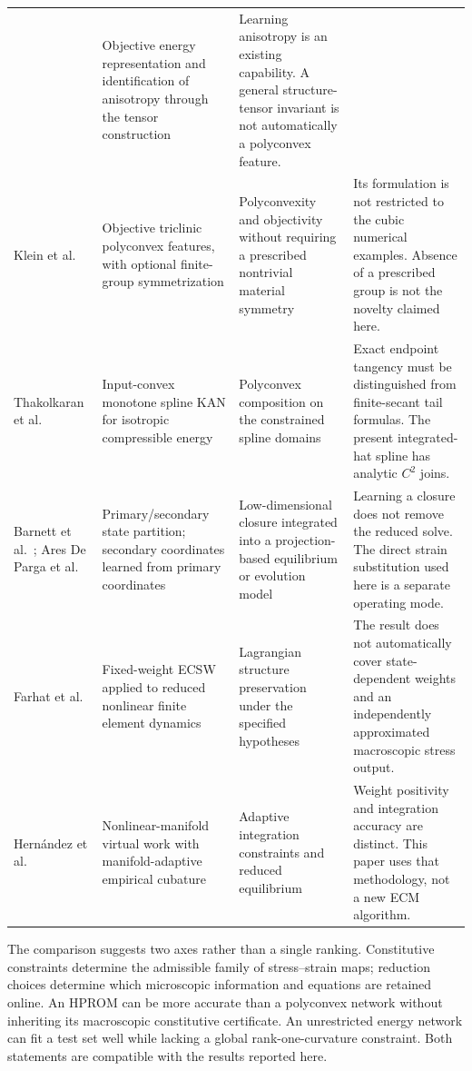 \begin{longtable}{@{}>{\raggedright\arraybackslash}p{2.6cm}>{\raggedright\arraybackslash}p{4.05cm}>{\raggedright\arraybackslash}p{4.15cm}>{\raggedright\arraybackslash}p{4.85cm}@{}}
& Objective energy representation and identification of anisotropy through the tensor construction
& Learning anisotropy is an existing capability. A general structure-tensor invariant is not automatically a polyconvex feature.\\
\addlinespace
Klein et al.~\cite{klein2026}
& Objective triclinic polyconvex features, with optional finite-group symmetrization
& Polyconvexity and objectivity without requiring a prescribed nontrivial material symmetry
& Its formulation is not restricted to the cubic numerical examples. Absence of a prescribed group is not the novelty claimed here.\\
\addlinespace
Thakolkaran et al.~\cite{thakolkaran2025}
& Input-convex monotone spline KAN for isotropic compressible energy
& Polyconvex composition on the constrained spline domains
& Exact endpoint tangency must be distinguished from finite-secant tail formulas. The present integrated-hat spline has analytic $C^2$ joins.\\
\addlinespace
Barnett et al.~\cite{barnett2023}; Ares De Parga et al.~\cite{aresdeparga2026nonlinear}
& Primary/secondary state partition; secondary coordinates learned from primary coordinates
& Low-dimensional closure integrated into a projection-based equilibrium or evolution model
& Learning a closure does not remove the reduced solve. The direct strain substitution used here is a separate operating mode.\\
\addlinespace
Farhat et al.~\cite{farhat2015}
& Fixed-weight ECSW applied to reduced nonlinear finite element dynamics
& Lagrangian structure preservation under the specified hypotheses
& The result does not automatically cover state-dependent weights and an independently approximated macroscopic stress output.\\
\addlinespace
Hern\'andez et al.~\cite{hernandez2026}
& Nonlinear-manifold virtual work with manifold-adaptive empirical cubature
& Adaptive integration constraints and reduced equilibrium
& Weight positivity and integration accuracy are distinct. This paper uses that methodology, not a new ECM algorithm.\\
\end{longtable}
\endgroup

The comparison suggests two axes rather than a single ranking. Constitutive constraints determine the admissible family of stress--strain maps; reduction choices determine which microscopic information and equations are retained online. An HPROM can be more accurate than a polyconvex network without inheriting its macroscopic constitutive certificate. An unrestricted energy network can fit a test set well while lacking a global rank-one-curvature constraint. Both statements are compatible with the results reported here.
